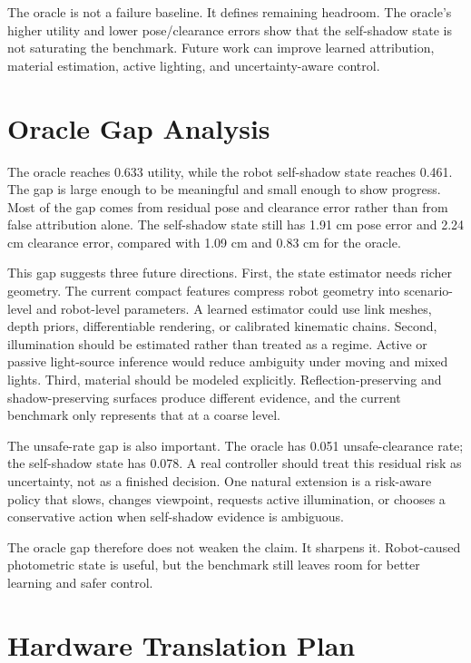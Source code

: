 \documentclass{article}
\begin{document}
The oracle is not a failure baseline. It defines remaining headroom. The oracle's higher utility and lower pose/clearance errors show that the self-shadow state is not saturating the benchmark. Future work can improve learned attribution, material estimation, active lighting, and uncertainty-aware control.

\clearpage
\section{Oracle Gap Analysis}

The oracle reaches 0.633 utility, while the robot self-shadow state reaches 0.461. The gap is large enough to be meaningful and small enough to show progress. Most of the gap comes from residual pose and clearance error rather than from false attribution alone. The self-shadow state still has 1.91 cm pose error and 2.24 cm clearance error, compared with 1.09 cm and 0.83 cm for the oracle.

This gap suggests three future directions. First, the state estimator needs richer geometry. The current compact features compress robot geometry into scenario-level and robot-level parameters. A learned estimator could use link meshes, depth priors, differentiable rendering, or calibrated kinematic chains. Second, illumination should be estimated rather than treated as a regime. Active or passive light-source inference would reduce ambiguity under moving and mixed lights. Third, material should be modeled explicitly. Reflection-preserving and shadow-preserving surfaces produce different evidence, and the current benchmark only represents that at a coarse level.

The unsafe-rate gap is also important. The oracle has 0.051 unsafe-clearance rate; the self-shadow state has 0.078. A real controller should treat this residual risk as uncertainty, not as a finished decision. One natural extension is a risk-aware policy that slows, changes viewpoint, requests active illumination, or chooses a conservative action when self-shadow evidence is ambiguous.

The oracle gap therefore does not weaken the claim. It sharpens it. Robot-caused photometric state is useful, but the benchmark still leaves room for better learning and safer control.

\clearpage
\section{Hardware Translation Plan}
\end{document}
